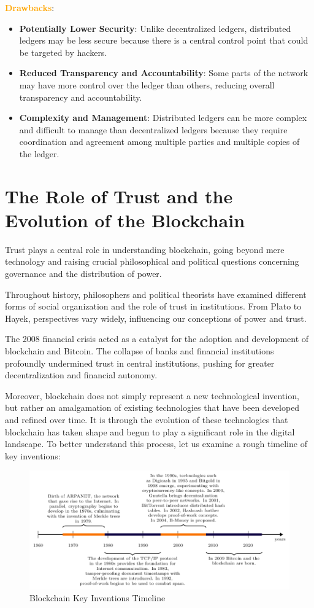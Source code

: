 \textbf{\textcolor{Orange}{Drawbacks}}:

\begin{itemize}
    \item \textbf{Potentially Lower Security}: Unlike decentralized ledgers, distributed ledgers may be less secure because there is a central control point that could be targeted by hackers.
    \item \textbf{Reduced Transparency and Accountability}: Some parts of the network may have more control over the ledger than others, reducing overall transparency and accountability.
    \item \textbf{Complexity and Management}: Distributed ledgers can be more complex and difficult to manage than decentralized ledgers because they require coordination and agreement among multiple parties and multiple copies of the ledger.
\end{itemize}


\section{The Role of Trust and the Evolution of the Blockchain}

Trust plays a central role in understanding blockchain, going beyond mere technology and raising crucial philosophical and political questions concerning governance and the distribution of power.

Throughout history, philosophers and political theorists have examined different forms of social organization and the role of trust in institutions. From Plato to Hayek, perspectives vary widely, influencing our conceptions of power and trust.

The 2008 financial crisis acted as a catalyst for the adoption and development of blockchain and Bitcoin. The collapse of banks and financial institutions profoundly undermined trust in central institutions, pushing for greater decentralization and financial autonomy.

Moreover, blockchain does not simply represent a new technological invention, but rather an amalgamation of existing technologies that have been developed and refined over time. It is through the evolution of these technologies that blockchain has taken shape and begun to play a significant role in the digital landscape. To better understand this process, let us examine a rough timeline of key inventions:

\begin{figure}[htbp]
\centering
\includegraphics[width=1\textwidth]{tikz/chapter1 - Blockchain Timeline.pdf}
\caption{Blockchain Key Inventions Timeline}
\end{figure}